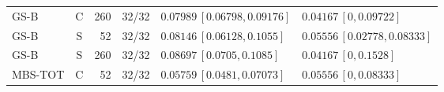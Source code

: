 \documentclass[10pt,a4paper]{article}
\begin{document}
\begin{longtable}{lcrcp{44mm}p{44mm}}
GS-B & C & 260 & 32/32 & \(0.07989\,[0.06798,0.09176]\) & \(0.04167\,[0,0.09722]\)\\
GS-B & S & 52 & 32/32 & \(0.08146\,[0.06128,0.1055]\) & \(0.05556\,[0.02778,0.08333]\)\\
GS-B & S & 260 & 32/32 & \(0.08697\,[0.0705,0.1085]\) & \(0.04167\,[0,0.1528]\)\\
MBS-TOT & C & 52 & 32/32 & \(0.05759\,[0.0481,0.07073]\) & \(0.05556\,[0,0.08333]\)\\

\end{longtable}
\end{document}
